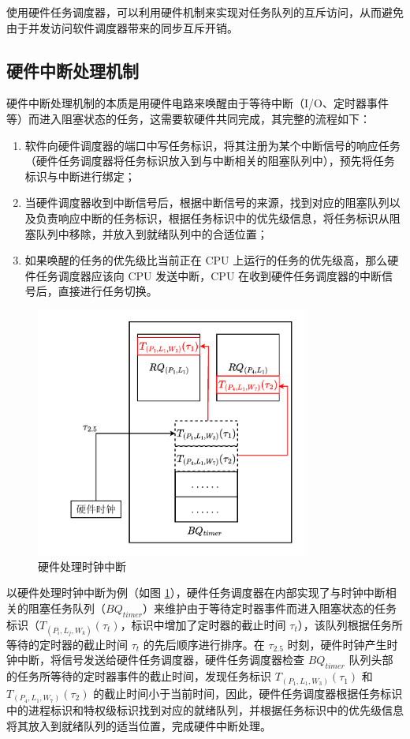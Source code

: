 使用硬件任务调度器，可以利用硬件机制来实现对任务队列的互斥访问，从而避免由于并发访问软件调度器带来的同步互斥开销。

\subsection{硬件中断处理机制}

硬件中断处理机制的本质是用硬件电路来唤醒由于等待中断（I/O、定时器事件等）而进入阻塞状态的任务，这需要软硬件共同完成，其完整的流程如下：

\begin{enumerate}
    \item 软件向硬件调度器的端口中写任务标识，将其注册为某个中断信号的响应任务（硬件任务调度器将任务标识放入到与中断相关的阻塞队列中），预先将任务标识与中断进行绑定；
    \item 当硬件调度器收到中断信号后，根据中断信号的来源，找到对应的阻塞队列以及负责响应中断的任务标识，根据任务标识中的优先级信息，将任务标识从阻塞队列中移除，并放入到就绪队列中的合适位置；
    \item 如果唤醒的任务的优先级比当前正在 CPU 上运行的任务的优先级高，那么硬件任务调度器应该向 CPU 发送中断，CPU 在收到硬件任务调度器的中断信号后，直接进行任务切换。
\end{enumerate}

\begin{figure}[htbp]
    \centering
    \includegraphics[width=0.8\textwidth]{figures/timer.pdf}
    \caption{硬件处理时钟中断}
    \label{figure:timer}
\end{figure}

以硬件处理时钟中断为例（如图 \ref{figure:timer}），硬件任务调度器在内部实现了与时钟中断相关的阻塞任务队列（$BQ_{timer}$）来维护由于等待定时器事件而进入阻塞状态的任务标识（$T_{(P_{i}, L_{j}, W_{k})}(\tau_{t})$，标识中增加了定时器的截止时间 $\tau_{t}$），该队列根据任务所等待的定时器的截止时间 $\tau_{t}$ 的先后顺序进行排序。在 $\tau_{2.5}$ 时刻，硬件时钟产生时钟中断，将信号发送给硬件任务调度器，硬件任务调度器检查 $BQ_{timer}$ 队列头部的任务所等待的定时器事件的截止时间，发现任务标识 $T_{(P_{1}, L_{1}, W_{3})}(\tau_{1})$ 和 $T_{(P_{4}, L_{1}, W_{7})}(\tau_{2})$ 的截止时间小于当前时间，因此，硬件任务调度器根据任务标识中的进程标识和特权级标识找到对应的就绪队列，并根据任务标识中的优先级信息将其放入到就绪队列的适当位置，完成硬件中断处理。

